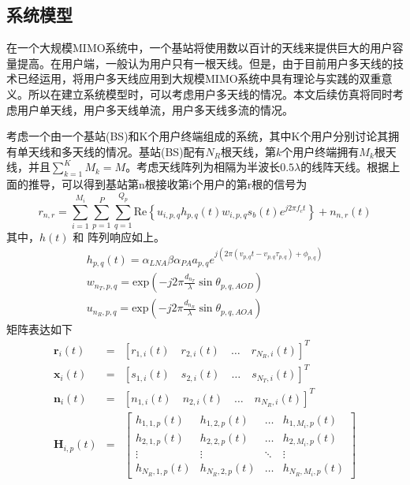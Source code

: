 \documentclass[bachelor,nocolorlinks, printoneside]{seuthesis} %
\begin{document}
\begin{Main}
\section{系统模型}
在一个大规模MIMO系统中，一个基站将使用数以百计的天线来提供巨大的用户容量提高。在用户端，一般认为用户只有一根天线。但是，由于目前用户多天线的技术已经运用，将用户多天线应用到大规模MIMO系统中具有理论与实践的双重意义。所以在建立系统模型时，可以考虑用户多天线的情况。本文后续仿真将同时考虑用户单天线，用户多天线单流，用户多天线多流的情况。

考虑一个由一个基站(BS)和K个用户终端组成的系统，其中K个用户分别讨论其拥有单天线和多天线的情况。基站(BS)配有$N_R$根天线，第$k$个用户终端拥有$M_k$根天线，并且$\sum_{k=1}^K M_k = M$。考虑天线阵列为相隔为半波长$0.5\lambda$的线阵天线。根据上面的推导，可以得到基站第n根接收第i个用户的第r根的信号为
\begin{equation}\label{key}
r_{n,r} = \sum^{M_i}_{i=1} \sum_{p=1}^{P} \sum_{q=1}^{Q_p} \mathrm{Re} \left \lbrace u_{i,p,q} h_{p,q} (t) w_{i,p,q} s_b(t) e^{j 2\pi f_c t} \right \rbrace + n_{n,r}(t)
\end{equation}
其中，$h(t)$ 和 阵列响应如上。
\begin{eqnarray}\label{key}
h_{p,q}(t) = \alpha_{LNA}\beta\alpha_{PA}a_{p,q}e^{j(2\pi 
	(v_{p,q}t-v_{p,q}\tau_{p,q})+\phi_{p,q}
	)} \\
w_{n_{T},p,q} = \mathrm{exp}(-j2\pi \frac{d_{n_{T}}}{\lambda}\sin \theta_{p,q,AOD})\\
u_{n_{R},p,q} = \mathrm{exp}(-j2\pi \frac{d_{n_{R}}}{\lambda}\sin \theta_{p,q,AOA})
\end{eqnarray}
矩阵表达如下
\begin{eqnarray}\label{key}
\mathbf{r}_{i}(t) & = &[r_{1,i}(t) \quad r_{2,i}(t) \quad\dots\quad r_{N_{R},i}(t)]^{T} \\
\mathbf{x}_{i}(t)& = &[s_{1,i}(t) \quad s_{2,i}(t) \quad\dots\quad s_{N_{T},i}(t)]^{T} \\
\mathbf{n}_{i}(t)& = &[n_{1,i}(t) \quad n_{2,i}(t) \quad\dots\quad n_{N_{R},i}(t)]^{T} \\
\mathbf{H}_{i,p}(t)& = &\left[ \begin{array}{cccc}
h_{1,1,p}(t) & h_{1,2,p}(t) & \ldots & h_{1,M_{i},p}(t) \\
h_{2,1,p}(t) & h_{2,2,p}(t) & \ldots & h_{2,M_{i},p}(t) \\
\vdots & \vdots & \ddots & \vdots \\
h_{N_{R},1,p}(t) & h_{N_{R},2,p}(t) & \ldots & h_{N_{R},M_{i},p}(t)
\end{array} \right] 

\end{eqnarray}
\end{Main}
\end{document}

